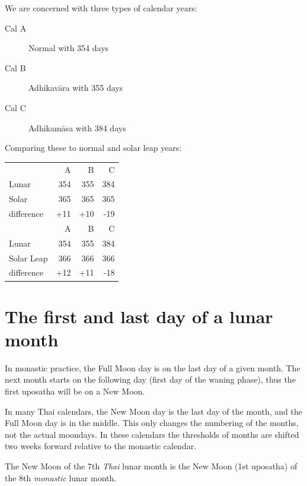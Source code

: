 \documentclass[11pt,oneside]{memoir-article}
\begin{document}
\begin{multicols}{2}

We are concerned with three types of calendar years:

\begin{description}
\item[{Cal A}] Normal with 354 days
\item[{Cal B}] Adhikavāra with 355 days
\item[{Cal C}] Adhikamāsa with 384 days
\end{description}

\columnbreak

Comparing these to normal and solar leap years:

\begin{center}
\begin{tabular}{lrrr}
 & A & B & C\\
Lunar & 354 & 355 & 384\\
Solar & 365 & 365 & 365\\
difference & +11 & +10 & -19\\
\hline
 & A & B & C\\
Lunar & 354 & 355 & 384\\
Solar Leap & 366 & 366 & 366\\
difference & +12 & +11 & -18\\
\end{tabular}
\end{center}

\end{multicols}

\section{The first and last day of a lunar month}
\label{sec-3-2}
\label{lunar-month-first-last}

In monastic practice, the Full Moon day is on the last day of a given
month. The next month starts on the following day (first day of the
waning phase), thus the first uposatha will be on a New Moon.

In many Thai calendars, the New Moon day is the last day of the month,
and the Full Moon day is in the middle. This only changes the
numbering of the months, not the actual moondays. In these calendars
the thresholds of months are shifted two weeks forward relative to the
monastic calendar.

The New Moon of the 7th \emph{Thai} lunar month is the New Moon (1st
uposatha) of the 8th \emph{monastic} lunar month.
\end{document}
